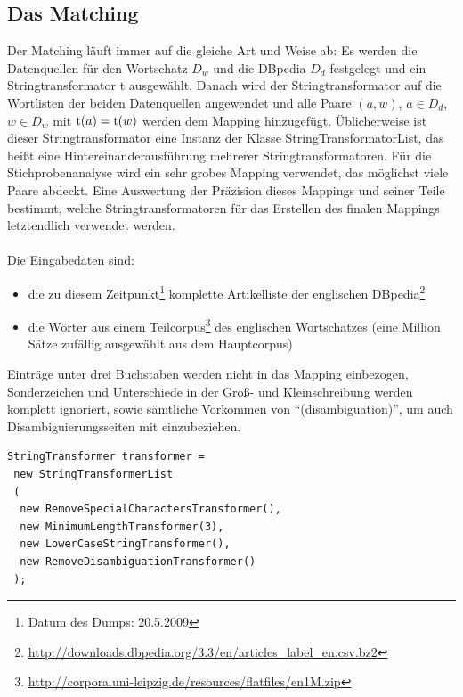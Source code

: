 \subsection{Das Matching}
Der Matching läuft immer auf die gleiche Art und Weise ab:
Es werden die Datenquellen für den Wortschatz $D_w$ und die DBpedia $D_d$ festgelegt und ein Stringtransformator t ausgewählt.
Danach wird der Stringtransformator auf die Wortlisten der beiden Datenquellen angewendet und alle Paare $(a,w)$, $a\in D_d$, $w\in D_w$ mit $\textnormal{t}(a)=\textnormal{t}(w)$ werden dem Mapping hinzugefügt.
Üblicherweise ist dieser Stringtransformator eine Instanz der Klasse StringTransformatorList, das heißt eine Hintereinanderausführung mehrerer Stringtransformatoren.
Für die Stichprobenanalyse wird ein sehr grobes Mapping verwendet, das möglichst viele Paare abdeckt. Eine Auswertung der Präzision dieses Mappings und seiner Teile bestimmt, welche Stringtransformatoren für das
Erstellen des finalen Mappings letztendlich verwendet werden.
\paragraph{}
Die Eingabedaten sind:
\begin{itemize}
\item die zu diesem Zeitpunkt\footnote{Datum des Dumps: 20.5.2009} komplette Artikelliste der englischen DBpedia\footnote{\url{http://downloads.dbpedia.org/3.3/en/articles_label_en.csv.bz2}}
\item die Wörter aus einem Teilcorpus\footnote{\url{http://corpora.uni-leipzig.de/resources/flatfiles/en1M.zip}} des englischen Wortschatzes (eine Million Sätze zufällig ausgewählt aus dem Hauptcorpus)
\end{itemize}

Einträge unter drei Buchstaben werden nicht in das Mapping einbezogen,
Sonderzeichen und Unterschiede in der Groß- und Kleinschreibung werden komplett ignoriert, sowie sämtliche Vorkommen von "`(disambiguation)"', um auch Disambiguierungsseiten mit einzubeziehen.

\begin{lstlisting}
StringTransformer transformer = 
 new StringTransformerList
 (
  new RemoveSpecialCharactersTransformer(),
  new MinimumLengthTransformer(3),
  new LowerCaseStringTransformer(),
  new RemoveDisambiguationTransformer()
 );
\end{lstlisting}
